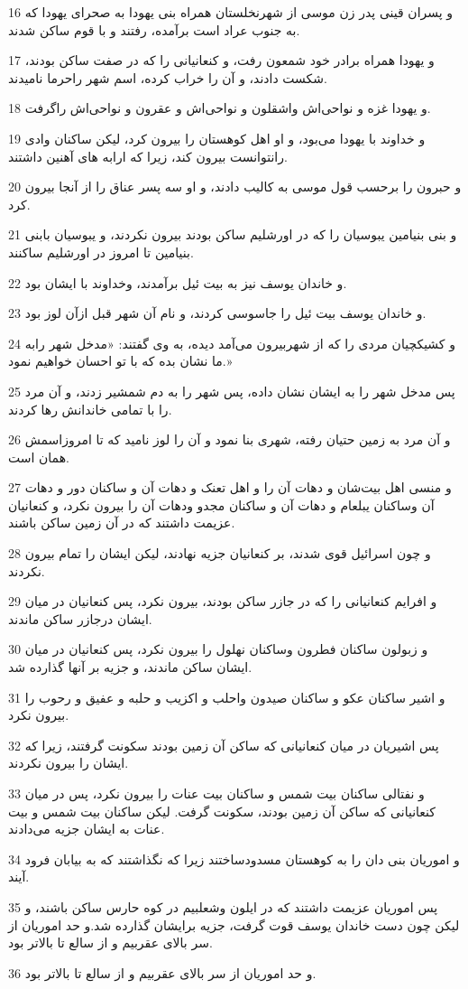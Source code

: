 \par 16 و پسران قینی پدر زن موسی از شهرنخلستان همراه بنی یهودا به صحرای یهودا که به جنوب عراد است برآمده، رفتند و با قوم ساکن شدند.
\par 17 و یهودا همراه برادر خود شمعون رفت، و کنعانیانی را که در صفت ساکن بودند، شکست دادند، و آن را خراب کرده، اسم شهر راحرما نامیدند.
\par 18 و یهودا غزه و نواحی‌اش واشقلون و نواحی‌اش و عقرون و نواحی‌اش راگرفت.
\par 19 و خداوند با یهودا می‌بود، و او اهل کوهستان را بیرون کرد، لیکن ساکنان وادی رانتوانست بیرون کند، زیرا که ارابه های آهنین داشتند.
\par 20 و حبرون را برحسب قول موسی به کالیب دادند، و او سه پسر عناق را از آنجا بیرون کرد.
\par 21 و بنی بنیامین یبوسیان را که در اورشلیم ساکن بودند بیرون نکردند، و یبوسیان بابنی بنیامین تا امروز در اورشلیم ساکنند.
\par 22 و خاندان یوسف نیز به بیت ئیل برآمدند، وخداوند با ایشان بود.
\par 23 و خاندان یوسف بیت ئیل را جاسوسی کردند، و نام آن شهر قبل ازآن لوز بود.
\par 24 و کشیکچیان مردی را که از شهربیرون می‌آمد دیده، به وی گفتند: «مدخل شهر رابه ما نشان بده که با تو احسان خواهیم نمود.»
\par 25 پس مدخل شهر را به ایشان نشان داده، پس شهر را به دم شمشیر زدند، و آن مرد را با تمامی خاندانش رها کردند.
\par 26 و آن مرد به زمین حتیان رفته، شهری بنا نمود و آن را لوز نامید که تا امروزاسمش همان است.
\par 27 و منسی اهل بیت‌شان و دهات آن را و اهل تعنک و دهات آن و ساکنان دور و دهات آن وساکنان یبلعام و دهات آن و ساکنان مجدو ودهات آن را بیرون نکرد، و کنعانیان عزیمت داشتند که در آن زمین ساکن باشند.
\par 28 و چون اسرائیل قوی شدند، بر کنعانیان جزیه نهادند، لیکن ایشان را تمام بیرون نکردند.
\par 29 و افرایم کنعانیانی را که در جازر ساکن بودند، بیرون نکرد، پس کنعانیان در میان ایشان درجازر ساکن ماندند.
\par 30 و زبولون ساکنان فطرون وساکنان نهلول را بیرون نکرد، پس کنعانیان در میان ایشان ساکن ماندند، و جزیه بر آنها گذارده شد.
\par 31 و اشیر ساکنان عکو و ساکنان صیدون واحلب و اکزیب و حلبه و عفیق و رحوب را بیرون نکرد.
\par 32 پس اشیریان در میان کنعانیانی که ساکن آن زمین بودند سکونت گرفتند، زیرا که ایشان را بیرون نکردند.
\par 33 و نفتالی ساکنان بیت شمس و ساکنان بیت عنات را بیرون نکرد، پس در میان کنعانیانی که ساکن آن زمین بودند، سکونت گرفت. لیکن ساکنان بیت شمس و بیت عنات به ایشان جزیه می‌دادند.
\par 34 و اموریان بنی دان را به کوهستان مسدودساختند زیرا که نگذاشتند که به بیابان فرود آیند.
\par 35 پس اموریان عزیمت داشتند که در ایلون وشعلبیم در کوه حارس ساکن باشند، و لیکن چون دست خاندان یوسف قوت گرفت، جزیه برایشان گذارده شد.و حد اموریان از سر بالای عقربیم و از سالع تا بالاتر بود.
\par 36 و حد اموریان از سر بالای عقربیم و از سالع تا بالاتر بود.
 
